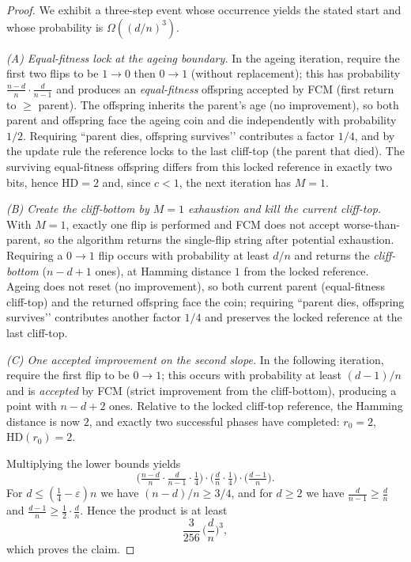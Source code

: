 \documentclass[lettersize,journal]{IEEEtran}
\newcommand{\HD}{\text{HD}}
\begin{document}
\begin{proof}
	We exhibit a three-step event whose occurrence yields the stated start and whose probability is $\Omega((d/n)^3)$.
	
	\emph{(A) Equal-fitness lock at the ageing boundary.} In the ageing iteration, require the first two flips to be $1\!\to 0$ then $0\!\to 1$ (without replacement); this has probability $\frac{n-d}{n}\cdot\frac{d}{n-1}$ and produces an \emph{equal-fitness} offspring accepted by FCM (first return to $\ge$ parent). The offspring inherits the parent’s age (no improvement), so both parent and offspring face the ageing coin and die independently with probability $1/2$. Requiring “parent dies, offspring survives’’ contributes a factor $1/4$, and by the update rule the reference locks to the last cliff-top (the parent that died). The surviving equal-fitness offspring differs from this locked reference in exactly two bits, hence $\HD=2$ and, since $c<1$, the next iteration has $M=1$.
	
	\emph{(B) Create the cliff-bottom by $M{=}1$ exhaustion and kill the current cliff-top.} With $M=1$, exactly one flip is performed and FCM does not accept worse-than-parent, so the algorithm returns the single-flip string after potential exhaustion. Requiring a $0\!\to 1$ flip occurs with probability at least $d/n$ and returns the \emph{cliff-bottom} ($n-d+1$ ones), at Hamming distance $1$ from the locked reference. Ageing does not reset (no improvement), so both current parent (equal-fitness cliff-top) and the returned offspring face the coin; requiring “parent dies, offspring survives’’ contributes another factor $1/4$ and preserves the locked reference at the last cliff-top.
	
	\emph{(C) One accepted improvement on the second slope.} In the following iteration, require the first flip to be $0\!\to 1$; this occurs with probability at least $(d-1)/n$ and is \emph{accepted} by FCM (strict improvement from the cliff-bottom), producing a point with $n-d+2$ ones. Relative to the locked cliff-top reference, the Hamming distance is now $2$, and exactly two successful phases have completed: $r_0=2$, $\HD(r_0)=2$.
	
	Multiplying the lower bounds yields
	\[
	\Big(\tfrac{n-d}{n}\cdot\tfrac{d}{n-1}\cdot\tfrac14\Big)\cdot
	\Big(\tfrac{d}{n}\cdot\tfrac14\Big)\cdot
	\Big(\tfrac{d-1}{n}\Big).
	\]
	For $d\le(\tfrac14-\varepsilon)n$ we have $(n-d)/n\ge 3/4$, and for $d\ge 2$ we have $\tfrac{d}{n-1}\ge\tfrac{d}{n}$ and $\tfrac{d-1}{n}\ge \tfrac12\cdot\tfrac{d}{n}$. Hence the product is at least
	\[
	\frac{3}{256}\,\Big(\frac{d}{n}\Big)^{\!3},
	\]
	which proves the claim.
\end{proof}
\end{document}
